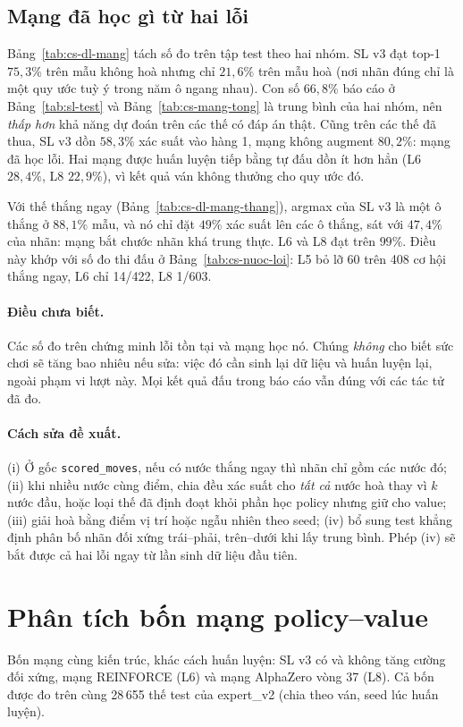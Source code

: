 \subsection{Mạng đã học gì từ hai lỗi}


Bảng~\ref{tab:cs-dl-mang} tách số đo trên tập test theo hai nhóm. SL v3 đạt top-1 $75{,}3\%$ trên mẫu không hoà nhưng
chỉ $21{,}6\%$ trên mẫu hoà (nơi nhãn đúng chỉ là một quy ước tuỳ ý trong năm ô ngang nhau). Con số $66{,}8\%$ báo cáo
ở Bảng~\ref{tab:sl-test} và Bảng~\ref{tab:cs-mang-tong} là trung bình của hai nhóm, nên \emph{thấp hơn} khả năng dự đoán
trên các thế có đáp án thật. Cũng trên các thế đã thua, SL v3 dồn $58{,}3\%$ xác suất vào hàng 1, mạng không augment
$80{,}2\%$: mạng đã học lỗi. Hai mạng được huấn luyện tiếp bằng tự đấu dồn ít hơn hẳn (L6 $28{,}4\%$, L8
$22{,}9\%$), vì kết quả ván không thưởng cho quy ước đó.

Với thế thắng ngay (Bảng~\ref{tab:cs-dl-mang-thang}), argmax của SL v3 là một ô thắng ở $88{,}1\%$ mẫu, và nó chỉ đặt
$49\%$ xác suất lên các ô thắng, sát với $47{,}4\%$ của nhãn: mạng bắt chước nhãn khá trung thực. L6 và L8 đạt trên
$99\%$. Điều này khớp với số đo thi đấu ở Bảng~\ref{tab:cs-nuoc-loi}: L5 bỏ lỡ 60 trên 408 cơ hội thắng ngay, L6 chỉ
14/422, L8 1/603.

\paragraph{Điều chưa biết.} Các số đo trên chứng minh lỗi tồn tại và mạng học nó. Chúng \emph{không} cho biết sức
chơi sẽ tăng bao nhiêu nếu sửa: việc đó cần sinh lại dữ liệu và huấn luyện lại, ngoài phạm vi lượt này. Mọi kết quả
đấu trong báo cáo vẫn đúng với các tác tử đã đo.

\paragraph{Cách sửa đề xuất.} (i) Ở gốc \texttt{scored\_moves}, nếu có nước thắng ngay thì nhãn chỉ gồm các nước đó;
(ii) khi nhiều nước cùng điểm, chia đều xác suất cho \emph{tất cả} nước hoà thay vì $k$ nước đầu, hoặc loại thế đã
định đoạt khỏi phần học policy nhưng giữ cho value; (iii) giải hoà bằng điểm vị trí hoặc ngẫu nhiên theo seed;
(iv) bổ sung test khẳng định phân bố nhãn đối xứng trái--phải, trên--dưới khi lấy trung bình. Phép (iv) sẽ bắt được
cả hai lỗi ngay từ lần sinh dữ liệu đầu tiên.

\section{Phân tích bốn mạng policy--value}
\label{sec:cs-mang}
Bốn mạng cùng kiến trúc, khác cách huấn luyện: SL v3 có và không tăng cường đối xứng, mạng REINFORCE (L6) và mạng
AlphaZero vòng 37 (L8). Cả bốn được đo trên cùng 28\,655 thế test của expert\_v2 (chia theo ván, seed lúc huấn luyện).

